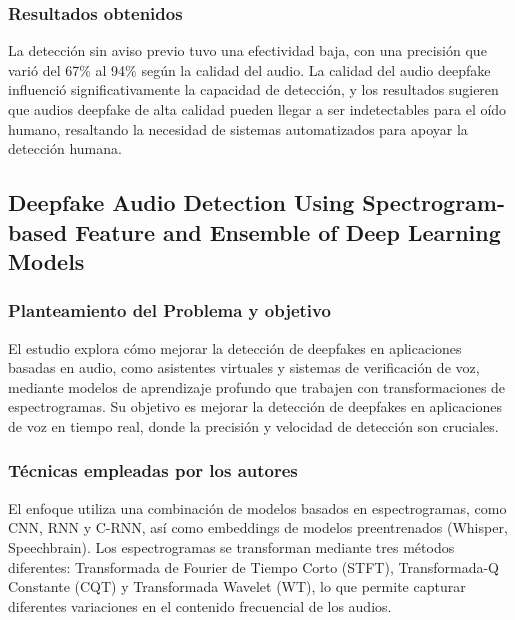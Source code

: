 \subsubsection{Resultados obtenidos}
La detección sin aviso previo tuvo una efectividad baja, con una precisión que varió del 67\% al 94\% según la calidad del audio. La calidad del audio deepfake influenció significativamente la capacidad de detección, y los resultados sugieren que audios deepfake de alta calidad pueden llegar a ser indetectables para el oído humano, resaltando la necesidad de sistemas automatizados para apoyar la detección humana.

\subsection{Deepfake Audio Detection Using Spectrogram-based Feature and Ensemble of Deep Learning Models \citep*{pr_dehghani2018copper}}

\subsubsection{Planteamiento del Problema y objetivo }
El estudio explora cómo mejorar la detección de deepfakes en aplicaciones basadas en audio, como asistentes virtuales y sistemas de verificación de voz, mediante modelos de aprendizaje profundo que trabajen con transformaciones de espectrogramas. Su objetivo es mejorar la detección de deepfakes en aplicaciones de voz en tiempo real, donde la precisión y velocidad de detección son cruciales.

\subsubsection{Técnicas empleadas por los autores}
El enfoque utiliza una combinación de modelos basados en espectrogramas, como CNN, RNN y C-RNN, así como embeddings de modelos preentrenados (Whisper, Speechbrain). Los espectrogramas se transforman mediante tres métodos diferentes: Transformada de Fourier de Tiempo Corto (STFT), Transformada-Q Constante (CQT) y Transformada Wavelet (WT), lo que permite capturar diferentes variaciones en el contenido frecuencial de los audios.


